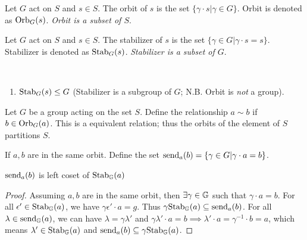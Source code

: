 \documentclass[../note.tex]{subfiles}
\begin{document}

\begin{definition}[Orbit] \label{def:orbit} \hypertarget{def:orbit_stabilizer}{}
	Let $G$ act on $S$ and $s \in S$. The orbit of $s$ is the set $\{\gamma\cdot s | \gamma \in G\}$. Orbit is denoted as $\text{Orb}_{G}({s})$.
	\emph{Orbit is a subset of $S$}.
\end{definition}

\begin{definition}[Stabilizer]\label{def:stabilizer} 
	Let $G$ act on $S$ and $s \in S$. The stabilizer of $s$ is the set $\{\gamma \in G | \gamma\cdot s = s\}$. Stabilizer is denoted as $\text{Stab}_{G}({s})$.
	\emph{Stabilizer is a subset of $G$}. 
\end{definition}

\begin{theorem}
	\ 
	\begin{enumerate}
		\item $\text{Stab}_{G}({s}) \leq G$ (Stabilizer is a subgroup of $G$; N.B. Orbit is \emph{not} a group).
	\end{enumerate}
\end{theorem}

\begin{theorem}
	Let $G$ be a group acting on the set $S$.
	Define the relationship $a\sim b$ if $b\in \text{Orb}_{G}({a})$.
	This is a equivalent relation; thus the orbits of the element of $S$ partitions $S$.
\end{theorem}

\begin{definition}[Send x]
	If $a,b$ are in the same orbit. Define the set $\text{send}_{a}({b})=\{\gamma\in G| \gamma \cdot a=b \}$.
\end{definition}

\begin{lemma}
$\text{send}_{a}({b})$ is left coset of $\text{Stab}_{\mathbb{G}}({a})$
\end{lemma}

\begin{proof}
	Assuming $a,b$ are in the same orbit, then $\exists \gamma \in \mathbb{G}$ such that $\gamma \cdot a = b$. 
	For all $\epsilon' \in \text{Stab}_{\mathbb{G}}({a})$, we have $\gamma \epsilon' \cdot a = g $. Thus $\gamma\text{Stab}_{\mathbb{G}}({a}) \subseteq \text{send}_{a}({b})$.
	For all $\lambda \in \text{send}_{\mathbb{G}}({a})$, we can have  $\lambda = \gamma\lambda'$ and $\gamma\lambda' \cdot a = b \implies \lambda' \cdot a = \gamma^{-1} \cdot b=a$, which means $\lambda' \in \text{Stab}_{\mathbb{G}}({a})$ and $\text{send}_{a}({b}) \subseteq \gamma\text{Stab}_{\mathbb{G}}({a})$.
\end{proof}
\end{document}
